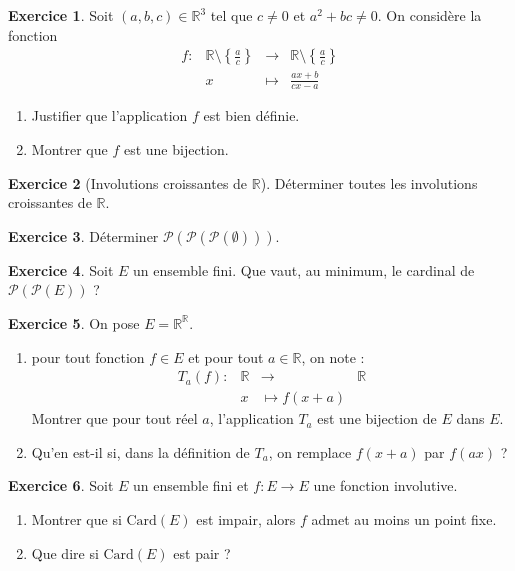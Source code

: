\documentclass[french]{book}
\newcommand{\R}{\mathbb{R}}
\newcommand{\card}{\text{Card}}
\theoremstyle{definition}
\newtheorem{ex}{Exercice}[chapter]
\theoremstyle{theorem}
\theoremstyle{remark}
\begin{document}
\begin{ex}
	Soit $(a,b,c)\in\R^3$ tel que $c\ne 0$ et $a^2+bc\ne 0$. On considère la fonction $$\begin{array}{lrcl}
		f:&\R\setminus\displaystyle\left\{\frac{a}{c}\right\}&\longrightarrow&\R\setminus\displaystyle\left\{\frac{a}{c}\right\} \\
		&x&\longmapsto&\displaystyle\frac{ax+b}{cx-a}
	\end{array}$$
	\begin{enumerate}
		\item Justifier que l'application $f$ est bien définie.
		\item Montrer que $f$ est une bijection.
	\end{enumerate}
\end{ex}

\begin{ex}[Involutions croissantes de $\R$]
	Déterminer toutes les involutions croissantes de $\R$.
\end{ex}

\begin{ex}
	Déterminer $\mathcal{P}(\mathcal{P}(\mathcal{P}(\emptyset)))$.
\end{ex}

\begin{ex}
	Soit $E$ un ensemble fini. Que vaut, au minimum, le cardinal de $\mathcal{P}(\mathcal{P}(E))$ ?
\end{ex}

\begin{ex}
	On pose $E=\R^\R$.
	\begin{enumerate}
		\item pour tout fonction $f\in E$ et pour tout $a\in\R$, on note : $$\begin{array}{lrcl}
			T_a(f):&\R&\longrightarrow&\R\\
			&x&\longmapsto f(x+a)
		\end{array}$$
		Montrer que pour tout réel $a$, l'application $T_a$ est une bijection de $E$ dans $E$.
		\item Qu'en est-il si, dans la définition de $T_a$, on remplace $f(x+a)$ par $f(ax)$ ?
	\end{enumerate}
\end{ex}

\begin{ex}
	Soit $E$ un ensemble fini et $f:E\to E$ une fonction involutive.
	\begin{enumerate}
		\item Montrer que si $\card(E)$ est impair, alors $f$ admet au moins un point fixe.
		\item Que dire si $\card(E)$ est pair ?
	\end{enumerate}
\end{ex}
\end{document}
